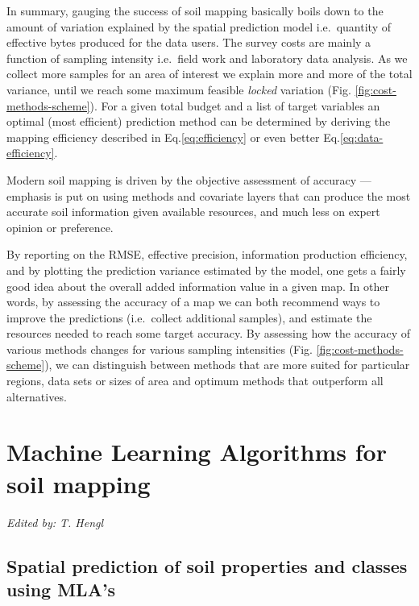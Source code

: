 \documentclass[graybox,natbib,nospthms,UStrade]{svmono}
\let\BeginKnitrBlock\begin \let\EndKnitrBlock\end
\let\BeginKnitrBlock\begin \let\EndKnitrBlock\end
\begin{document}
In summary, gauging the success of soil mapping basically boils down to
the amount of variation explained by the spatial prediction model
i.e.~quantity of effective bytes produced for the data users. The survey costs
are mainly a function of sampling intensity i.e.~field work and
laboratory data analysis. As we collect more samples for an area of
interest we explain more and more of the total variance, until we reach
some maximum feasible \emph{locked} variation
(Fig. \ref{fig:cost-methods-scheme}). For a given total budget and a
list of target variables an optimal (most efficient) prediction method
can be determined by deriving the mapping efficiency described in
Eq.\eqref{eq:efficiency} or even better Eq.\eqref{eq:data-efficiency}.

\BeginKnitrBlock{rmdnote}
Modern soil mapping is driven by the objective assessment of
accuracy --- emphasis is put on using methods and covariate
layers that can produce the most accurate soil information given
available resources, and much less on expert opinion or preference.
\EndKnitrBlock{rmdnote}

By reporting on the RMSE, effective precision, information production efficiency,
and by plotting the prediction variance estimated by the model, one gets
a fairly good idea about the overall added information value in a given
map. In other words, by assessing the accuracy of a map we can both recommend
ways to improve the predictions (i.e.~collect additional samples),
and estimate the resources needed to reach some target accuracy. By
assessing how the accuracy of various methods changes for various
sampling intensities (Fig. \ref{fig:cost-methods-scheme}), we can
distinguish between methods that are more suited for particular regions,
data sets or sizes of area and optimum methods that outperform all
alternatives.

\hypertarget{soilmapping-using-mla}{%
\chapter{Machine Learning Algorithms for soil mapping}\label{soilmapping-using-mla}}

\emph{Edited by: T. Hengl}

\hypertarget{spatial-prediction-of-soil-properties-and-classes-using-mlas}{%
\section{Spatial prediction of soil properties and classes using MLA's}\label{spatial-prediction-of-soil-properties-and-classes-using-mlas}}
\end{document}
